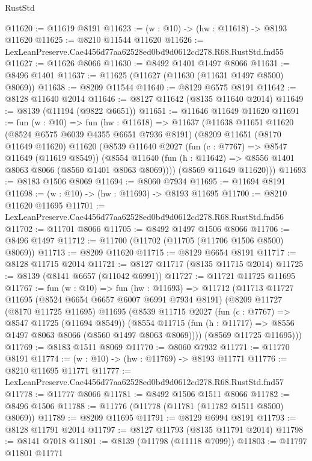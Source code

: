 \begin{lexlean}{RustStd}
\begin{coremodule}
@11620 := @11619 @8191
@11623 := (w : @10) -> (hw : @11618) -> @8193 @11620
@11625 := @8210 @11544 @11620
@11626 := LexLeanPreserve.Cae4456d77aa62528ed0bd9d0612cd278.R68.RustStd.fnd55
@11627 := @11626 @8066
@11630 := @8492 @1401 @1497 @8066
@11631 := @8496 @1401
@11637 := @11625 (@11627 (@11630 (@11631 @1497 @8500) @8069))
@11638 := @8209 @11544
@11640 := @8129 @6575 @8191
@11642 := @8128 @11640 @2014
@11646 := @8127 @11642 (@8135 @11640 @2014)
@11649 := @8139 (@11194 (@9822 @6651))
@11651 := @11646 @11649 @11620
@11691 := fun (w : @10) =>
  fun (hw : @11618) =>
  @11637
    (@11638
      @11651
      @11620
      (@8524 @6575 @6039 @4355 @6651 @7936 @8191)
      (@8209
        @11651
        (@8170 @11649 @11620)
        @11620
        (@8539
          @11640
          @2027
          (fun (c : @7767) => @8547 @11649 (@11619 @8549))
          (@8554 @11640 (fun (h : @11642) => @8556 @1401 @8063 @8066 (@8560 @1401 @8063 @8069))))
        (@8569 @11649 @11620)))
@11693 := @8183 @1506 @8069
@11694 := @8060 @7934
@11695 := @11694 @8191
@11698 := (w : @10) -> (hw : @11693) -> @8193 @11695
@11700 := @8210 @11620 @11695
@11701 := LexLeanPreserve.Cae4456d77aa62528ed0bd9d0612cd278.R68.RustStd.fnd56
@11702 := @11701 @8066
@11705 := @8492 @1497 @1506 @8066
@11706 := @8496 @1497
@11712 := @11700 (@11702 (@11705 (@11706 @1506 @8500) @8069))
@11713 := @8209 @11620
@11715 := @8129 @6654 @8191
@11717 := @8128 @11715 @2014
@11721 := @8127 @11717 (@8135 @11715 @2014)
@11725 := @8139 (@8141 @6657 (@11042 @6991))
@11727 := @11721 @11725 @11695
@11767 := fun (w : @10) =>
  fun (hw : @11693) =>
  @11712
    (@11713
      @11727
      @11695
      (@8524 @6654 @6657 @6007 @6991 @7934 @8191)
      (@8209
        @11727
        (@8170 @11725 @11695)
        @11695
        (@8539
          @11715
          @2027
          (fun (c : @7767) => @8547 @11725 (@11694 @8549))
          (@8554 @11715 (fun (h : @11717) => @8556 @1497 @8063 @8066 (@8560 @1497 @8063 @8069))))
        (@8569 @11725 @11695)))
@11769 := @8183 @1511 @8069
@11770 := @8060 @7932
@11771 := @11770 @8191
@11774 := (w : @10) -> (hw : @11769) -> @8193 @11771
@11776 := @8210 @11695 @11771
@11777 := LexLeanPreserve.Cae4456d77aa62528ed0bd9d0612cd278.R68.RustStd.fnd57
@11778 := @11777 @8066
@11781 := @8492 @1506 @1511 @8066
@11782 := @8496 @1506
@11788 := @11776 (@11778 (@11781 (@11782 @1511 @8500) @8069))
@11789 := @8209 @11695
@11791 := @8129 @6994 @8191
@11793 := @8128 @11791 @2014
@11797 := @8127 @11793 (@8135 @11791 @2014)
@11798 := @8141 @7018
@11801 := @8139 (@11798 (@11118 @7099))
@11803 := @11797 @11801 @11771

\end{coremodule}
\end{lexlean}
